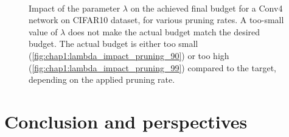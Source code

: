 \begin{figure}
\centering
{}
\\
  \caption{\centering Impact of the parameter $\lambda$ on the achieved final
  budget for a Conv4 network on CIFAR10 dataset, for various pruning rates. A
  too-small value of $\lambda$ does not make the actual budget match the desired
  budget. The actual budget is either too small
  (\cref{fig:chap1:lambda_impact_pruning_90}) or too high
  (\cref{fig:chap1:lambda_impact_pruning_99}) compared to the target, depending
  on the applied pruning rate.}
\label{fig:chap1:lambda_impact}
\end{figure}  

\section{Conclusion and perspectives}
